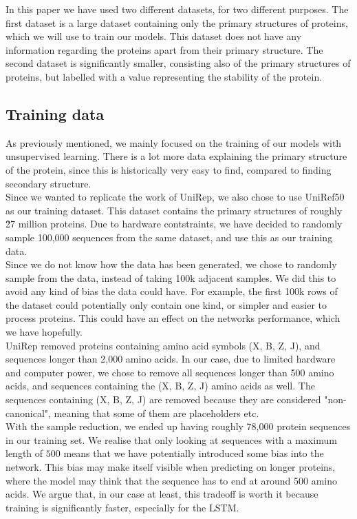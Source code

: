 In this paper we have used two different datasets, for two different purposes. The first dataset is a large dataset containing only the primary structures of proteins, which we will use to train our models. This dataset does not have any information regarding the proteins apart from their primary structure. The second dataset is significantly smaller, consisting also of the primary structures of proteins, but labelled with a value representing the stability of the protein.

\subsection{Training data}
As previously mentioned, we mainly focused on the training of our models with unsupervised learning. There is a lot more data explaining the primary structure of the protein, since this is historically very easy to find, compared to finding secondary structure. \\

\noindent
Since we wanted to replicate the work of UniRep, we also chose to use UniRef50 as our training dataset.\cite{uniref} This dataset contains the primary structures of roughly \~ 27 million proteins. Due to hardware contstraints, we have decided to randomly sample 100,000 sequences from the same dataset, and use this as our training data. \\
Since we do not know how the data has been generated, we chose to randomly sample from the data, instead of taking 100k adjacent samples. We did this to avoid any kind of bias the data could have. For example, the first 100k rows of the dataset could potentially only contain one kind, or simpler and easier to process proteins. This could have an effect on the networks performance, which we have hopefully.\\

\noindent
UniRep removed proteins containing amino acid symbols (X, B, Z, J), and sequences longer than 2,000 amino acids.\cite{unirep} In our case, due to limited hardware and computer power, we chose to remove all sequences longer than 500 amino acids, and sequences containing the (X, B, Z, J) amino acids as well. The sequences containing (X, B, Z, J) are removed because they are considered "non-canonical", meaning that some of them are placeholders etc.\\

\noindent
With the sample reduction, we ended up having roughly 78,000 protein sequences in our training set. We realise that only looking at sequences with a maximum length of $500$ means that we have potentially introduced some bias into the network. This bias may make itself visible when predicting on longer proteins, where the model may think that the sequence has to end at around 500 amino acids. We argue that, in our case at least, this tradeoff is worth it because training is significantly faster, especially for the LSTM.\\

